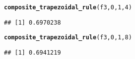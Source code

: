 \documentclass[11pt, a4paper]{article}\usepackage[]{graphicx}\usepackage[]{xcolor}
\makeatletter
\newcommand{\hlnum}[1]{\textcolor[rgb]{0.686,0.059,0.569}{#1}}%
\newcommand{\hldef}[1]{\textcolor[rgb]{0.345,0.345,0.345}{#1}}%
\newcommand{\hlkwd}[1]{\textcolor[rgb]{0.737,0.353,0.396}{\textbf{#1}}}%
\newenvironment{kframe}{%
 \def\at@end@of@kframe{}%
 \ifinner\ifhmode%
  \def\at@end@of@kframe{\end{minipage}}%
  \begin{minipage}{\columnwidth}%
 \fi\fi%
 \def\FrameCommand##1{\hskip\@totalleftmargin \hskip-\fboxsep
 \colorbox{shadecolor}{##1}\hskip-\fboxsep
     \hskip-\linewidth \hskip-\@totalleftmargin \hskip\columnwidth}%
 \MakeFramed {\advance\hsize-\width
   \@totalleftmargin\z@ \linewidth\hsize
   \@setminipage}}%
 {\par\unskip\endMakeFramed%
 \at@end@of@kframe}
\newenvironment{knitrout}{}{} %
\makeatother
\begin{document}
\begin{knitrout}
\color{fgcolor}\begin{kframe}
\begin{alltt}
\hlkwd{composite_trapezoidal_rule}\hldef{(f3,} \hlnum{0}\hldef{,} \hlnum{1}\hldef{,} \hlnum{4}\hldef{)}
\end{alltt}
\begin{verbatim}
## [1] 0.6970238
\end{verbatim}
\end{kframe}
\end{knitrout}

\begin{knitrout}
\color{fgcolor}\begin{kframe}
\begin{alltt}
\hlkwd{composite_trapezoidal_rule}\hldef{(f3,} \hlnum{0}\hldef{,} \hlnum{1}\hldef{,} \hlnum{8}\hldef{)}
\end{alltt}
\begin{verbatim}
## [1] 0.6941219
\end{verbatim}
\end{kframe}
\end{knitrout}
\end{document}
